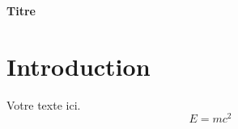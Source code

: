 \documentclass[11pt,a4paper]{article}
\begin{document}
\begin{center}\Large\textbf{Titre}\end{center}
\section{Introduction}
Votre texte ici.
\[ E = mc^2 \]
\end{document}
